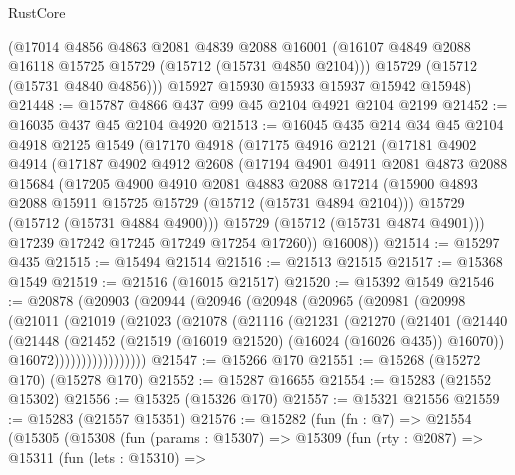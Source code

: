 \begin{lexlean}{RustCore}
\begin{coremodule}
      (@17014
        @4856
        @4863
        @2081
        @4839
        @2088
        @16001
        (@16107 @4849 @2088 @16118 @15725 @15729 (@15712 (@15731 @4850 @2104)))
        @15729
        (@15712 (@15731 @4840 @4856)))
      @15927
      @15930
      @15933
      @15937
      @15942
      @15948)
@21448 := @15787 @4866 @437 @99 @45 @2104 @4921 @2104 @2199
@21452 := @16035 @437 @45 @2104 @4920
@21513 := @16045
    @435
    @214
    @34
    @45
    @2104
    @4918
    @2125
    @1549
    (@17170
      @4918
      (@17175
        @4916
        @2121
        (@17181
          @4902
          @4914
          (@17187
            @4902
            @4912
            @2608
            (@17194
              @4901
              @4911
              @2081
              @4873
              @2088
              @15684
              (@17205
                @4900
                @4910
                @2081
                @4883
                @2088
                @17214
                (@15900 @4893 @2088 @15911 @15725 @15729 (@15712 (@15731 @4894 @2104)))
                @15729
                (@15712 (@15731 @4884 @4900)))
              @15729
              (@15712 (@15731 @4874 @4901)))
            @17239
            @17242
            @17245
            @17249
            @17254
            @17260))
        @16008))
@21514 := @15297 @435
@21515 := @15494 @21514
@21516 := @21513 @21515
@21517 := @15368 @1549
@21519 := @21516 (@16015 @21517)
@21520 := @15392 @1549
@21546 := @20878
    (@20903
      (@20944
        (@20946
          (@20948
            (@20965
              (@20981
                (@20998
                  (@21011
                    (@21019
                      (@21023
                        (@21078
                          (@21116
                            (@21231
                              (@21270
                                (@21401
                                  (@21440
                                    (@21448
                                      (@21452
                                        (@21519 (@16019 @21520) (@16024 (@16026 @435)) @16070))
                                      @16072)))))))))))))))))
@21547 := @15266 @170
@21551 := @15268 (@15272 @170) (@15278 @170)
@21552 := @15287 @16655
@21554 := @15283 (@21552 @15302)
@21556 := @15325 (@15326 @170)
@21557 := @15321 @21556
@21559 := @15283 (@21557 @15351)
@21576 := @15282
    (fun (fn : @7) =>
    @21554
      (@15305
        (@15308
          (fun (params : @15307) =>
          @15309
            (fun (rty : @2087) =>
            @15311
              (fun (lets : @15310) =>

\end{coremodule}
\end{lexlean}
